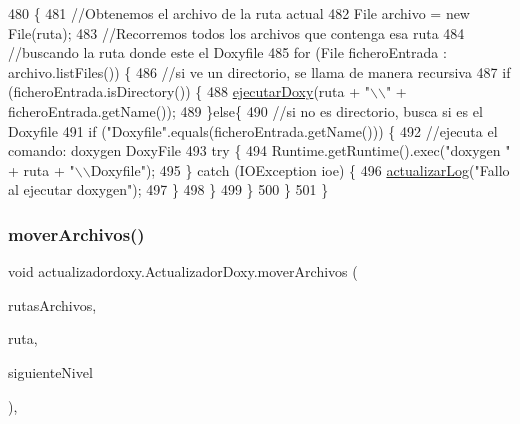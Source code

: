 \begin{DoxyCode}
480                                           \{
481         \textcolor{comment}{//Obtenemos el archivo de la ruta actual}
482         File archivo = \textcolor{keyword}{new} File(ruta);
483         \textcolor{comment}{//Recorremos todos los archivos que contenga esa ruta}
484         \textcolor{comment}{//buscando la ruta donde este el Doxyfile}
485         \textcolor{keywordflow}{for} (File ficheroEntrada : archivo.listFiles()) \{
486             \textcolor{comment}{//si ve un directorio, se llama de manera recursiva}
487             \textcolor{keywordflow}{if} (ficheroEntrada.isDirectory()) \{
488                 \mbox{\hyperlink{classactualizadordoxy_1_1_actualizador_doxy_ae7d94f01945c2c9c2d1fab249652cc70}{ejecutarDoxy}}(ruta + \textcolor{stringliteral}{"\(\backslash\)\(\backslash\)"} + ficheroEntrada.getName());
489             \}\textcolor{keywordflow}{else}\{
490                 \textcolor{comment}{//si no es directorio, busca si es el Doxyfile}
491                 \textcolor{keywordflow}{if} (\textcolor{stringliteral}{"Doxyfile"}.equals(ficheroEntrada.getName())) \{
492                     \textcolor{comment}{//ejecuta el comando: doxygen DoxyFile}
493                     \textcolor{keywordflow}{try} \{
494                         Runtime.getRuntime().exec(\textcolor{stringliteral}{"doxygen "} + ruta + \textcolor{stringliteral}{"\(\backslash\)\(\backslash\)Doxyfile"});
495                     \} \textcolor{keywordflow}{catch} (IOException ioe) \{
496                         \mbox{\hyperlink{classactualizadordoxy_1_1_actualizador_doxy_a1ad41046efbaaf40a60b34da347f9090}{actualizarLog}}(\textcolor{stringliteral}{"Fallo al ejecutar doxygen"});
497                     \}
498                 \}
499             \}   
500         \}
501     \}
\end{DoxyCode}
\mbox{\label{classactualizadordoxy_1_1_actualizador_doxy_acf04af5d317d03499a2a05a3091592e5}} 
\subsubsection{\texorpdfstring{mover\+Archivos()}{moverArchivos()}}
{\footnotesize\ttfamily void actualizadordoxy.\+Actualizador\+Doxy.\+mover\+Archivos (\begin{DoxyParamCaption}\item[{Array\+List$<$ String $>$}]{rutas\+Archivos,  }\item[{String}]{ruta,  }\item[{int}]{siguiente\+Nivel }\end{DoxyParamCaption})\hspace{0.3cm}{\ttfamily [inline]}, {\ttfamily [private]}}


